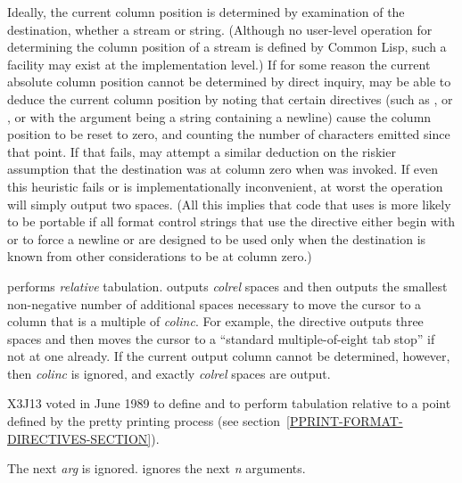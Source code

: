 \begin{flushdesc}
Ideally, the current column position is determined by examination of the
destination, whether a stream or string. (Although no user-level
operation for determining the column position of a stream is defined
by Common Lisp, such a facility may exist at the implementation level.)
If for some reason the current absolute column position cannot be determined
by direct inquiry,
 may be able to deduce the current column position by noting
that certain directives (such as \cd{{\Xtilde}\%}, or \cd{{\Xtilde}\&},
or  with the argument being a string containing a newline) cause
the column position to be reset to zero, and counting the number of characters
emitted since that point.  If that fails,  may attempt a
similar deduction on the riskier assumption that the destination was
at column zero when  was invoked.  If even this heuristic fails
or is implementationally inconvenient, at worst
the  operation will simply output two spaces.
(All this implies that code that uses  is
more likely to be portable if all format control strings that use 
the  directive either begin with \cd{{\Xtilde}\%} or \cd{{\Xtilde}\&}
to force a newline
or are designed to be used only when the destination is known from other
considerations to be at column zero.)

 performs \emph{relative} tabulation.
 outputs \emph{colrel} spaces
and then outputs the smallest non-negative
number of additional spaces necessary to move the cursor
to a column that is a multiple
of \emph{colinc}.  For example, the directive  outputs
three spaces and then moves the cursor to a ``standard multiple-of-eight
tab stop'' if not at one already.
If the current output column cannot be determined, however,
then \emph{colinc} is ignored, and exactly \emph{colrel} spaces are output.

\begin{new}
X3J13 voted in June 1989  to define 
and  to perform tabulation relative to a point defined
by the pretty printing process (see section~\ref{PPRINT-FORMAT-DIRECTIVES-SECTION}).
\end{new}

\item[\cd{{\Xtilde}*}]
The next \emph{arg} is ignored.   ignores the next \emph{n} arguments.


\end{flushdesc}
